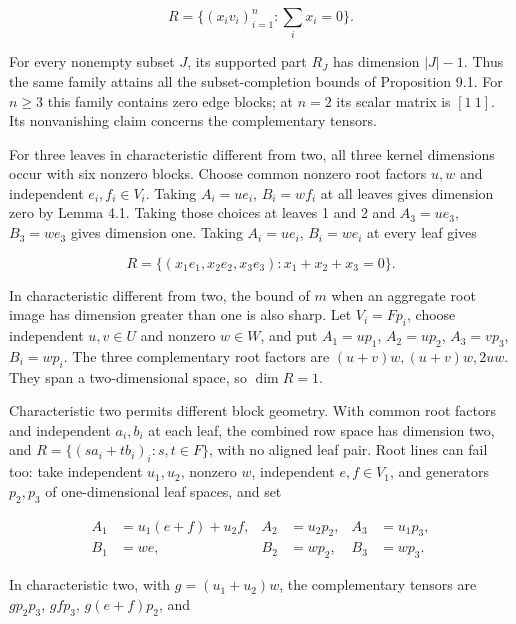 \documentclass[11pt]{article}
\begin{document}
\nopagebreak[4]

\begin{equation*}
R=\{(x_iv_i)_{i=1}^n:\sum_i x_i=0\}.
\end{equation*}

For every nonempty subset $J$, its supported part $R_J$ has dimension $|J|-1$. Thus the same family attains all the subset-completion bounds of Proposition 9.1. For $n\geq3$ this family contains zero edge blocks; at $n=2$ its scalar matrix is $[1\ 1]$. Its nonvanishing claim concerns the complementary tensors.


For three leaves in characteristic different from two, all three kernel dimensions occur with six nonzero blocks. Choose common nonzero root factors $u,w$ and independent $e_i,f_i\in V_i$. Taking $A_i=ue_i$, $B_i=wf_i$ at all leaves gives dimension zero by Lemma 4.1. Taking those choices at leaves 1 and 2 and $A_3=ue_3$, $B_3=we_3$ gives dimension one. Taking $A_i=ue_i$, $B_i=we_i$ at every leaf gives


\nopagebreak[4]

\begin{equation}
R=\{(x_1e_1,x_2e_2,x_3e_3):x_1+x_2+x_3=0\}.
\tag{61}
\end{equation}

In characteristic different from two, the bound of $m$ when an aggregate root image has dimension greater than one is also sharp. Let $V_i=Fp_i$, choose independent $u,v\in U$ and nonzero $w\in W$, and put $A_1=up_1$, $A_2=up_2$, $A_3=vp_3$, $B_i=wp_i$. The three complementary root factors are $(u+v)w,(u+v)w,2uw$. They span a two-dimensional space, so $\dim R=1$.


Characteristic two permits different block geometry. With common root factors and independent $a_i,b_i$ at each leaf, the combined row space has dimension two, and $R=\{(sa_i+tb_i)_i:s,t\in F\}$, with no aligned leaf pair. Root lines can fail too: take independent $u_1,u_2$, nonzero $w$, independent $e,f\in V_1$, and generators $p_2,p_3$ of one-dimensional leaf spaces, and set


\nopagebreak[4]

\begin{equation}
\begin{aligned}
A_1&=u_1(e+f)+u_2f,&A_2&=u_2p_2,&A_3&=u_1p_3,\\
B_1&=we,&B_2&=wp_2,&B_3&=wp_3.
\end{aligned}
\tag{62}
\end{equation}

In characteristic two, with $g=(u_1+u_2)w$, the complementary tensors are $gp_2p_3$, $gfp_3$, $g(e+f)p_2$, and
\end{document}
